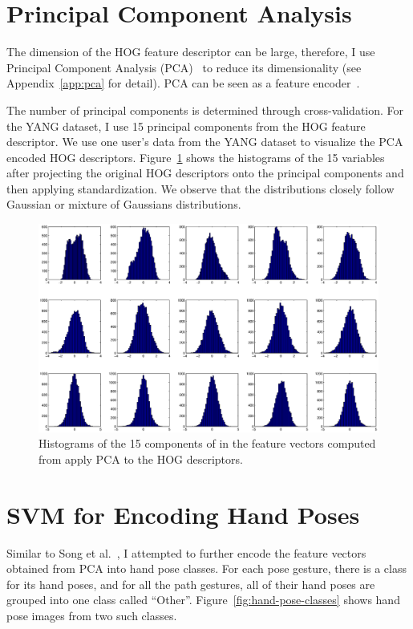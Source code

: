\section{Principal Component Analysis}
The dimension of the HOG feature descriptor can be large, therefore, I use
Principal Component Analysis (PCA)~\cite{pca} to reduce its dimensionality (see
Appendix~\ref{app:pca} for detail). PCA can be seen as a feature
encoder~\cite{ranzato07}.

The number of principal components is determined through cross-validation. For
the YANG dataset, I use 15 principal components from the HOG feature descriptor.
We use one user's data from the YANG dataset to visualize the PCA
encoded HOG descriptors. Figure~\ref{fig:pca} shows the histograms of the 15
variables after projecting the original HOG descriptors onto the principal
components and then applying standardization.
We observe that the distributions closely follow Gaussian or mixture of
Gaussians distributions.

\begin{figure}[tbh]
\includegraphics[width=\columnwidth]{figures/hist_pca.eps}
\caption{Histograms of the 15 components of in the feature vectors computed
from apply PCA to the HOG descriptors.}
\label{fig:pca}
\end{figure}

\section{SVM for Encoding Hand Poses}
Similar to Song et al.~\cite{song12}, I attempted to further encode the feature
vectors obtained from PCA into hand pose classes. For each pose
gesture, there is a class for its hand poses, and for all the path
gestures, all of their hand poses are grouped into one class called ``Other''.
Figure~\ref{fig:hand-pose-classes} shows hand pose images from two such classes.

